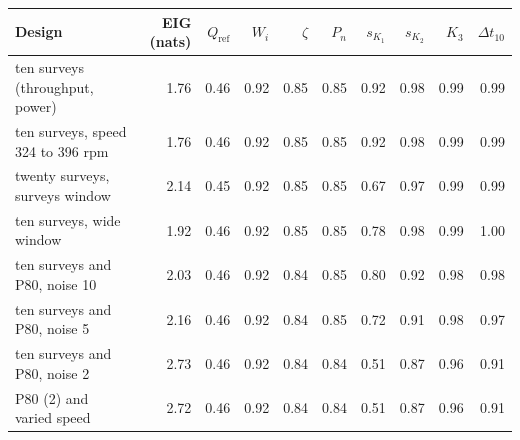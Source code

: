 \begin{tabular}{@{}lrrrrrrrrr@{}}
\toprule
Design & EIG (nats) & $Q_{\mathrm{ref}}$ & $W_i$ & $\zeta$ & $P_n$ & $s_{K_1}$ & $s_{K_2}$ & $K_3$ & $\Delta t_{10}$ \\
\midrule
ten surveys (throughput, power) & 1.76 & 0.46 & 0.92 & 0.85 & 0.85 & 0.92 & 0.98 & 0.99 & 0.99 \\
ten surveys, speed 324 to 396 rpm & 1.76 & 0.46 & 0.92 & 0.85 & 0.85 & 0.92 & 0.98 & 0.99 & 0.99 \\
twenty surveys, surveys window & 2.14 & 0.45 & 0.92 & 0.85 & 0.85 & 0.67 & 0.97 & 0.99 & 0.99 \\
ten surveys, wide window & 1.92 & 0.46 & 0.92 & 0.85 & 0.85 & 0.78 & 0.98 & 0.99 & 1.00 \\
ten surveys and P80, noise 10\pct{} & 2.03 & 0.46 & 0.92 & 0.84 & 0.85 & 0.80 & 0.92 & 0.98 & 0.98 \\
ten surveys and P80, noise 5\pct{} & 2.16 & 0.46 & 0.92 & 0.84 & 0.85 & 0.72 & 0.91 & 0.98 & 0.97 \\
ten surveys and P80, noise 2\pct{} & 2.73 & 0.46 & 0.92 & 0.84 & 0.84 & 0.51 & 0.87 & 0.96 & 0.91 \\
P80 (2\pct{}) and varied speed & 2.72 & 0.46 & 0.92 & 0.84 & 0.84 & 0.51 & 0.87 & 0.96 & 0.91 \\
\bottomrule
\end{tabular}
